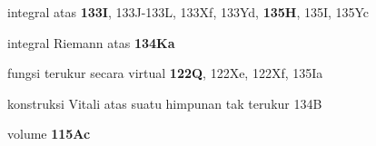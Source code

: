 integral atas {\bf 133I}, 133J-133L, 
133Xf, 133Yd, {\bf 135H}, 135I, 135Yc

integral Riemann atas {\bf 134Ka}













































\indexmedskip






























fungsi terukur secara virtual {\bf 122Q}, 122Xe, 122Xf, 135Ia

konstruksi Vitali atas suatu himpunan tak terukur 134B









volume {\bf 115Ac}












